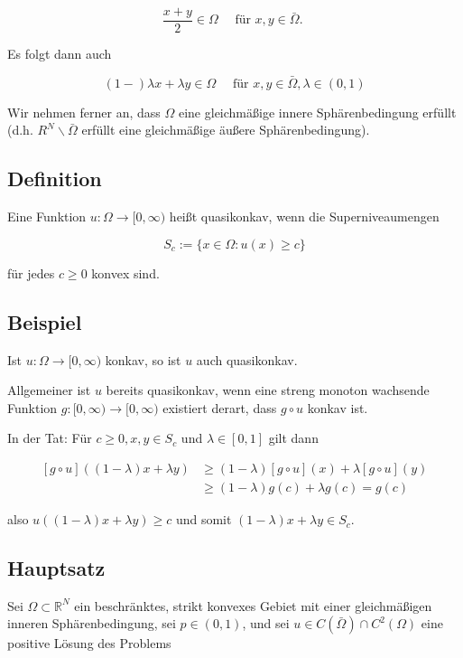 \documentclass[10pt, letterpaper]{article}
\begin{document}
$$
\frac{x+y}{2} \in \Omega \quad \text { für } x, y \in \bar{\Omega} \text {. }
$$

Es folgt dann auch

$$
(1-) \lambda x+\lambda y \in \Omega \quad \text { für } x, y \in \bar{\Omega}, \lambda \in(0,1)
$$

Wir nehmen ferner an, dass $\Omega$ eine gleichmäßige innere Sphärenbedingung erfüllt (d.h. $R^{N} \backslash \bar{\Omega}$ erfüllt eine gleichmäßige äußere Sphärenbedingung).

\subsection*{Definition}

Eine Funktion $u: \Omega \rightarrow[0, \infty)$ heißt quasikonkav, wenn die Superniveaumengen

$$
S_{c}:=\{x \in \Omega: u(x) \geq c\}
$$

für jedes $c \geq 0$ konvex sind.

\subsection*{Beispiel}

Ist $u: \Omega \rightarrow[0, \infty)$ konkav, so ist $u$ auch quasikonkav.

Allgemeiner ist $u$ bereits quasikonkav, wenn eine streng monoton wachsende Funktion $g:[0, \infty) \rightarrow[0, \infty)$ existiert derart, dass $g \circ u$ konkav ist.

In der Tat: Für $c \geq 0, x, y \in S_{c}$ und $\lambda \in[0,1]$ gilt dann

$$
\begin{aligned}
{[g \circ u]((1-\lambda) x+\lambda y) } & \geq(1-\lambda)[g \circ u](x)+\lambda[g \circ u](y) \\
& \geq(1-\lambda) g(c)+\lambda g(c)=g(c)
\end{aligned}
$$

also $u((1-\lambda) x+\lambda y) \geq c$ und somit $(1-\lambda) x+\lambda y \in S_{c}$.

\subsection*{Hauptsatz}

Sei $\Omega \subset \mathbb{R}^{N}$ ein beschränktes, strikt konvexes Gebiet mit einer gleichmäßigen inneren Sphärenbedingung, sei $p \in(0,1)$, und sei $u \in C(\bar{\Omega}) \cap C^{2}(\Omega)$ eine positive Lösung des Problems
\end{document}
